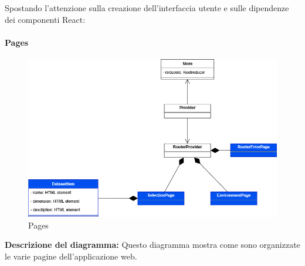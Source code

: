 Spostando l'attenzione sulla creazione dell'interfaccia utente e sulle dipendenze dei componenti React:

\paragraph{Pages}
\begin{figure}[h!] \centering
    \includegraphics[scale=0.45]{template/images/uml_front/ui/pages.png}
    \caption{Pages}
\end{figure}
\textbf{Descrizione del diagramma:}
Questo diagramma mostra come sono organizzate le varie pagine dell'applicazione web.
